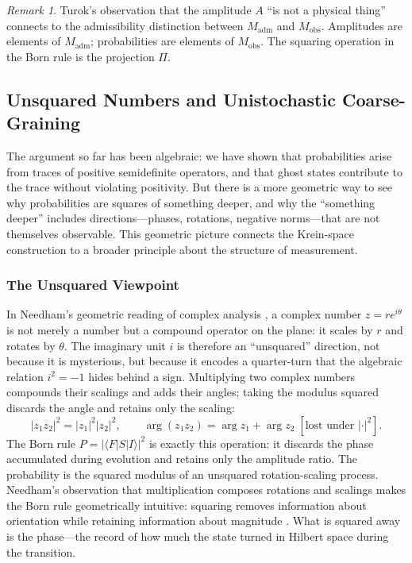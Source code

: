 \documentclass[12pt,a4paper]{article}
\theoremstyle{remark}
\newtheorem{remark}{Remark}[section]
\begin{document}
\begin{remark}
Turok's observation that the amplitude $A$ ``is not a physical thing''
connects to the admissibility distinction between $M_{\mathrm{adm}}$ and
$M_{\mathrm{obs}}$. Amplitudes are elements of $M_{\mathrm{adm}}$;
probabilities are elements of $M_{\mathrm{obs}}$. The squaring operation
in the Born rule is the projection $\Pi$.
\end{remark}

\subsection{Unsquared Numbers and Unistochastic Coarse-Graining}

The argument so far has been algebraic: we have shown that probabilities
arise from traces of positive semidefinite operators, and that ghost states
contribute to the trace without violating positivity. But there is a more
geometric way to see why probabilities are squares of something deeper,
and why the ``something deeper'' includes directions---phases, rotations,
negative norms---that are not themselves observable. This geometric picture
connects the Krein-space construction to a broader principle about the
structure of measurement.

\subsubsection*{The Unsquared Viewpoint}

In Needham's geometric reading of complex analysis \cite{needham1997},
a complex number $z = re^{i\theta}$ is not merely a number but a compound
operator on the plane: it scales by $r$ and rotates by $\theta$. The imaginary unit $i$
is therefore an ``unsquared'' direction, not because it is mysterious, but
because it encodes a quarter-turn that the algebraic relation $i^2 = -1$
hides behind a sign. Multiplying two complex numbers compounds their
scalings and adds their angles; taking the modulus squared discards the
angle and retains only the scaling:
\begin{equation}
  |z_1 z_2|^2 = |z_1|^2 |z_2|^2, \qquad
  \arg(z_1 z_2) = \arg z_1 + \arg z_2\;[\text{lost under } |\cdot|^2].
\end{equation}
The Born rule $P = |\langle F|S|I\rangle|^2$ is exactly this operation:
it discards the phase accumulated during evolution and retains only the
amplitude ratio. The probability is the squared modulus of an unsquared
rotation-scaling process. Needham's observation that multiplication composes
rotations and scalings makes the Born rule geometrically intuitive: squaring
removes information about orientation while retaining information about
magnitude \cite{needham1997}. What is squared away is the phase---the record
of how much the state turned in Hilbert space during the transition.
\end{document}
